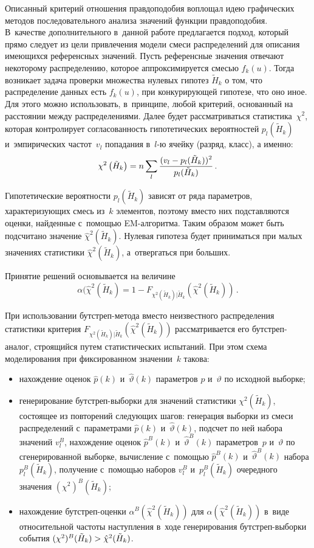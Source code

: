 \begin{multicols}{2}
     Описанный критерий отношения прав\-до\-по\-добия воплощал идею
графических методов последовательного анализа значений функции
правдоподобия. В~качестве дополнительного в~данной \mbox{работе} предлагается
подход, который прямо следует из цели привлечения модели смеси
распределений для описания имеющихся референсных значений. Пусть
референсные значения отвечают некоторому распределению, которое
аппроксимируется смесью $f_k(u)$. Тогда возникает задача проверки
множества нулевых гипотез $\tilde{H}_k$ о том, что распределение данных
есть $f_k(u)$, при конкурирующей гипотезе, что оно иное. Для этого можно
использовать, в~принципе, любой критерий, основанный на расстоянии между
распределениями. Далее будет рассматриваться статистика~$\chi^2$, которая
контролирует согласованность гипотетических вероятностей $p_l(\tilde{H}_k)$
и~эмпирических частот~$v_l$ попадания в~$l$-ю ячейку (разряд, класс), а
именно:
     $$
     \chi^2\left( \tilde{H}_k\right) = n\sum\limits_l \displaystyle\frac{\displaystyle (v_l-p_l(\tilde{H}_k))^2\mathstrut}{\displaystyle p_l(\tilde{H}_k)\mathstrut}\,.
     $$

Гипотетические вероятности $ p_l(\tilde{H}_k)$ зависят от ряда параметров,
характеризующих смесь из~$k$ элементов, поэтому вместо них подставляются
оценки, найденные с~помощью EM-ал\-го\-рит\-ма. Таким образом может быть
подсчитано значение $\hat{\chi}^2(\tilde{H}_k)$. Нулевая гипотеза будет
приниматься при малых значениях статистики  $\hat{\chi}^2(\tilde{H}_k)$,
а~отвергаться при больших.

     Принятие решений основывается на величине
 $$
 \alpha (\hat{\chi}^2(\tilde{H}_k)=1- F_{\chi^2(\tilde{H}_k)\vert \tilde{H}_k}
 (\hat{\chi}^2(\tilde{H}_k))\,.
 $$

 При использовании бут\-стреп-ме\-то\-да вместо
неизвестного распределения статистики критерия
$F_{\chi^2(\tilde{H}_k)\vert\tilde{H}_k}(\hat{\chi}^2(\tilde{H}_k))$
рассматривается его бут\-стреп-ана\-лог, строящийся путем статистических
испытаний. При этом схема моделирования при фиксированном значении~$k$
такова:
     \begin{itemize}
\item нахождение оценок  $\hat{p}(k)$ и~$\hat{\vartheta}(k)$
параметров $p$ и~$\vartheta$  по исходной выборке;
\item генерирование бут\-стреп-вы\-бор\-ки для значений статистики
$\chi^2(\tilde{H}_k)$,
состоящее из повторений сле\-ду\-ющих шагов: генерация выборки из смеси
распределений с~параметрами  $\hat{p}(k)$ и~$\hat{\vartheta}(k)$,
подсчет по ней набора значений $v_l^B$,
нахождение оценок $\hat{p}^B(k)$ и~$\hat{\vartheta}^B(k)$
па\-ра\-мет\-ров~$p$ и~$\vartheta$  по сгенерированной выборке,
вычисление с~по\-мощью  $\hat{p}^B(k)$ и~$\hat{\vartheta}^B(k)$ набора
$p_l^B(\tilde{H}_k)$, получение с~по\-мощью
наборов $v_l^B$  и~$p_l^B(\tilde{H}_k)$  очередного значения
 $(\chi^2)^B(\tilde{H}_k)$;
\item нахождение бут\-стреп-оцен\-ки  $\alpha^B(\hat{\chi}^2(\tilde{H}_k))$
для $\alpha(\hat{\chi}^2(\tilde{H}_k))$  в~виде
относительной частоты наступления в~ходе генерирования
бут\-стреп-вы\-бор\-ки события
$(\chi^2)^B (\tilde{H}_k)\hm > \hat{\chi}^2(\tilde{H}_k)$.
\end{itemize}


\end{multicols}
